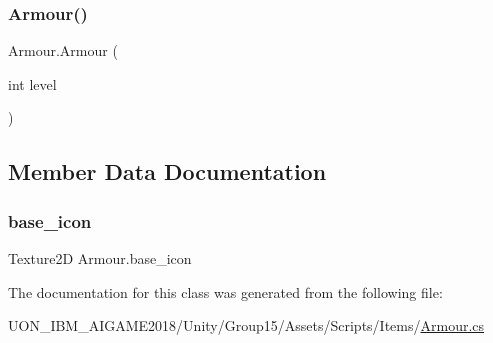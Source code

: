 \subsubsection{\texorpdfstring{Armour()}{Armour()}}
{\footnotesize\ttfamily Armour.\+Armour (\begin{DoxyParamCaption}\item[{int}]{level }\end{DoxyParamCaption})\hspace{0.3cm}{\ttfamily [inline]}}



\subsection{Member Data Documentation}
\mbox{\label{class_armour_a13dbc37ca412b07302c3eb15b48059e2}} 
\subsubsection{\texorpdfstring{base\_icon}{base\_icon}}
{\footnotesize\ttfamily Texture2D Armour.\+base\+\_\+icon\hspace{0.3cm}{\ttfamily [static]}}



The documentation for this class was generated from the following file\+:\begin{DoxyCompactItemize}
\item 
U\+O\+N\+\_\+\+I\+B\+M\+\_\+\+A\+I\+G\+A\+M\+E2018/\+Unity/\+Group15/\+Assets/\+Scripts/\+Items/\mbox{\hyperlink{_armour_8cs}{Armour.\+cs}}\end{DoxyCompactItemize}
